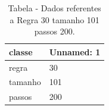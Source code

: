 \begin{table}[H]
\centering
\caption{Tabela - Dados referentes a Regra 30 tamanho 101 passos 200.}
\label{tab:regra_30_tamanho_101_passos_200}
\begin{tabular}{ll}
\toprule
classe & Unnamed: 1 \\
\midrule
regra & 30 \\
tamanho & 101 \\
passos & 200 \\
\bottomrule
\end{tabular}

\end{table}
